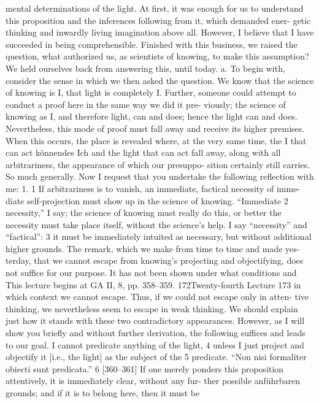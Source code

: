 mental determinations of the light. At first, it was enough for us to understand
this proposition and the inferences following from it, which demanded ener-
getic thinking and inwardly living imagination above all. However, I believe
that I have succeeded in being comprehensible. Finished with this business,
we raised the question, what authorized us, as scientists of knowing, to make
this assumption? We held ourselves back from answering this, until today.
a. To begin with, consider the sense in which we then asked the question. We
know that the science of knowing is I, that light is completely I. Further,
someone could attempt to conduct a proof here in the same way we did it pre-
viously; the science of knowing as I, and therefore light, can and does; hence
the light can and does. Nevertheless, this mode of proof must fall away and
receive its higher premises. When this occurs, the place is revealed where, at
the very same time, the I that can act {könnendes Ich} and the light that can act
fall away, along with all arbitrariness, the appearance of which our presuppo-
sition certainly still carries.
So much generally. Now I request that you undertake the following
reflection with me:
1. 1 If arbitrariness is to vanish, an immediate, factical necessity of imme-
diate self-projection must show up in the science of knowing. “Immediate 2
necessity,” I say; the science of knowing must really do this, or better the
necessity must take place itself, without the science’s help. I say “necessity” and
“factical”: 3 it must be immediately intuited as necessary, but without additional
higher grounds. The remark, which we make from time to time and made yes-
terday, that we cannot escape from knowing’s projecting and objectifying, does
not suffice for our purpose. It has not been shown under what conditions and
This lecture begins at GA II, 8, pp. 358–359.
172Twenty-fourth Lecture
173
in which context we cannot escape. Thus, if we could not escape only in atten-
tive thinking, we nevertheless seem to escape in weak thinking. We should
explain just how it stands with these two contradictory appearances.
However, as I will show you briefly and without further derivation, the
following suffices and leads to our goal. I cannot predicate anything of the
light, 4 unless I just project and objectify it [i.e., the light] as the subject of the 5
predicate. “Non nisi formaliter obiecti sunt predicata.” 6 [360–361] If one merely
ponders this proposition attentively, it is immediately clear, without any fur-
ther possible {anführbaren} grounds; and if it is to belong here, then it must be
